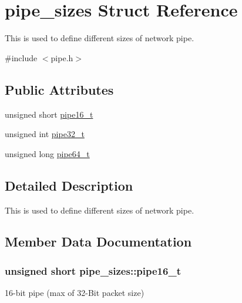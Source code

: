 \hypertarget{structpipe__sizes}{}\section{pipe\+\_\+sizes Struct Reference}
\label{structpipe__sizes}


This is used to define different sizes of network pipe.  




{\ttfamily \#include $<$pipe.\+h$>$}

\subsection*{Public Attributes}
\begin{DoxyCompactItemize}
\item 
unsigned short \hyperlink{structpipe__sizes_ad45fbc171dd7dc906819db3662f01912}{pipe16\+\_\+t}
\item 
unsigned int \hyperlink{structpipe__sizes_a5e62f43829e6cc2027e8ebfcfde43fc2}{pipe32\+\_\+t}
\item 
unsigned long \hyperlink{structpipe__sizes_a442e035eb8f5cbc6a674ca3737bd938f}{pipe64\+\_\+t}
\end{DoxyCompactItemize}


\subsection{Detailed Description}
This is used to define different sizes of network pipe. 

\subsection{Member Data Documentation}
\hypertarget{structpipe__sizes_ad45fbc171dd7dc906819db3662f01912}{}
\subsubsection[{pipe16\+\_\+t}]{\setlength{\rightskip}{0pt plus 5cm}unsigned short pipe\+\_\+sizes\+::pipe16\+\_\+t}\label{structpipe__sizes_ad45fbc171dd7dc906819db3662f01912}
16-\/bit pipe (max of 32-\/\+Bit packet size) \hypertarget{structpipe__sizes_a5e62f43829e6cc2027e8ebfcfde43fc2}{}
